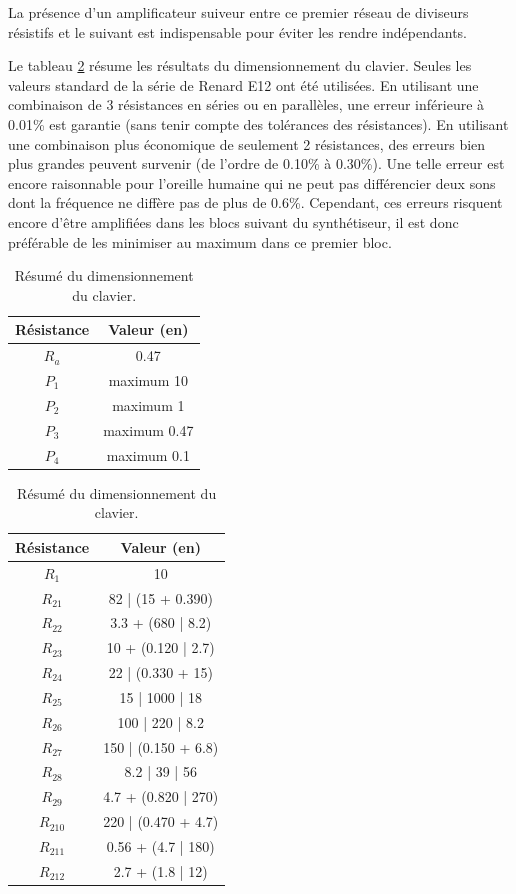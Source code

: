 La présence d'un amplificateur suiveur entre ce premier
réseau de diviseurs résistifs et le suivant est indispensable
pour éviter les rendre indépendants.

Le tableau \ref{tab:keyboard-dim} résume les résultats du dimensionnement
du clavier. Seules les valeurs standard de la série de Renard
E12 ont été utilisées. En utilisant une combinaison de 3
résistances en séries ou en parallèles, une erreur inférieure
à 0.01\% est garantie (sans tenir compte des tolérances des
résistances). En utilisant une combinaison plus économique
de seulement 2 résistances, des erreurs bien plus grandes
peuvent survenir (de l'ordre de 0.10\% à 0.30\%). Une telle
erreur est encore raisonnable pour l'oreille humaine qui ne
peut pas différencier deux sons dont la fréquence ne diffère
pas de plus de 0.6\%\cite{frequency-jnd}. Cependant, ces erreurs
risquent encore d'être amplifiées dans les blocs suivant du
synthétiseur, il est donc préférable de les minimiser au maximum
dans ce premier bloc.

\begin{table}[ht]
	\centering
		\begin{tabular}{|c|c|}
			\hline
				Résistance & Valeur (en\unit{}{\kilo\ohm}) \\
			\hline
				$R_a$ & 0.47 \\
			\hline
				$P_1$ & maximum 10 \\
			\hline
				$P_2$ & maximum 1 \\
			\hline
				$P_3$ & maximum 0.47 \\
			\hline
				$P_4$ & maximum 0.1 \\
			\hline
		\end{tabular}
		\quad
		\begin{tabular}{|c|c|}
			\hline
				Résistance & Valeur (en\unit{}{\kilo\ohm}) \\
			\hline
				$R_1$ & 10 \\
			\hline
				$R_{21}$ & 82 | (15 + 0.390) \\
			\hline
				$R_{22}$ & 3.3 + (680 | 8.2) \\
			\hline
				$R_{23}$ & 10 + (0.120 | 2.7) \\
			\hline
				$R_{24}$ & 22 | (0.330 + 15) \\
			\hline
				$R_{25}$ & 15 | 1000 | 18 \\
			\hline
				$R_{26}$ & 100 | 220 | 8.2 \\
			\hline
				$R_{27}$ & 150 | (0.150 + 6.8) \\
			\hline
				$R_{28}$ & 8.2 | 39 | 56 \\
			\hline
				$R_{29}$ & 4.7 + (0.820 | 270) \\
			\hline
				$R_{210}$ & 220 | (0.470 + 4.7) \\
			\hline
				$R_{211}$ & 0.56 + (4.7 | 180) \\
			\hline
				$R_{212}$ & 2.7 + (1.8 | 12) \\
			\hline
		\end{tabular}
	\caption{Résumé du dimensionnement du clavier.}
	\label{tab:keyboard-dim}
\end{table}

